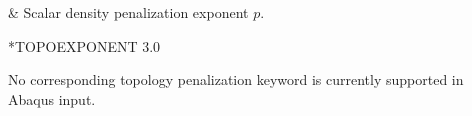 \begin{keyworddata}
 & Scalar density penalization exponent \(p\). \\
\end{keyworddata}

\exampleheading
\begin{dialectexamples}
\begin{femasterdeck}
*TOPOEXPONENT
3.0
\end{femasterdeck}
\begin{noabaqus}
No corresponding topology penalization keyword is currently supported in Abaqus input.
\end{noabaqus}
\end{dialectexamples}
